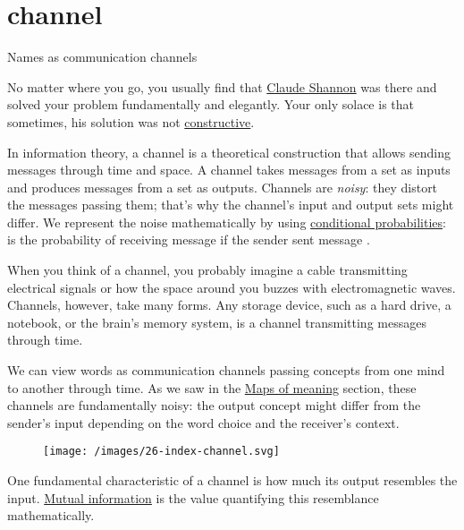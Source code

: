 \documentclass{article}
\begin{document}
\section{channel}{Names as communication channels}

No matter where you go, you usually find that \href{https://en.wikipedia.org/wiki/Claude_Shannon}{Claude Shannon} was there and solved your problem fundamentally and elegantly.
Your only solace is that sometimes, his solution was not \href{https://en.wikipedia.org/wiki/Constructive_proof}{constructive}.

In information theory, a channel is a theoretical construction that allows sending messages through time and space.
A channel takes messages from a set  as inputs and produces messages from a set  as outputs.
Channels are \emph{noisy}: they distort the messages passing them; that's why the channel's input and output sets might differ.
We represent the noise mathematically by using \href{https://en.wikipedia.org/wiki/Conditional_probability}{conditional probabilities}:  is the probability of receiving message  if the sender sent message .

When you think of a channel, you probably imagine a cable transmitting electrical signals or how the space around you buzzes with electromagnetic waves.
Channels, however, take many forms.
Any storage device, such as a hard drive, a notebook, or the brain's memory system, is a channel transmitting messages through time.

We can view words as communication channels passing concepts from one mind to another through time.
As we saw in the \href{#maps-of-meaning}{Maps of meaning} section, these channels are fundamentally noisy: the output concept might differ from the sender's input depending on the word choice and the receiver's context.

\begin{figure}[grayscale-diagram]
  \texttt{[image: /images/26-index-channel.svg]}
\end{figure}

One fundamental characteristic of a channel is how much its output resembles the input.
\href{https://en.wikipedia.org/wiki/Mutual_information}{Mutual information} is the value quantifying this resemblance mathematically.
\end{document}
